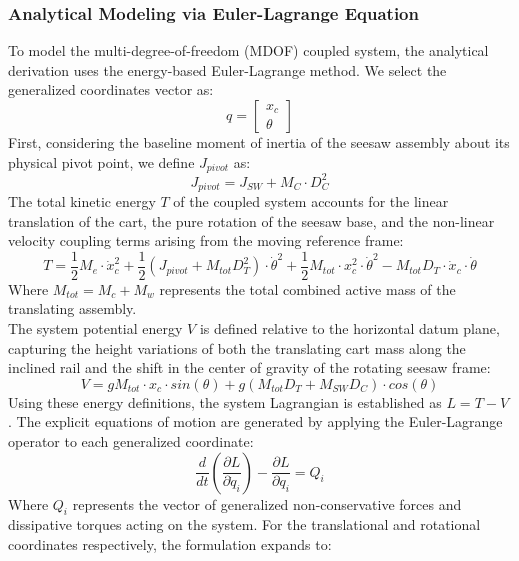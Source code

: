 \documentclass[11pt,a4paper]{article}
\begin{document}
\subsubsection{Analytical Modeling via Euler-Lagrange Equation}\label{subsub:seesaw_euler}
To model the multi-degree-of-freedom (MDOF) coupled system, the analytical derivation uses the energy-based Euler-Lagrange method. We select the generalized coordinates vector as:
\begin{equation}
    q = \begin{bmatrix}
        x_c \\ \theta
    \end{bmatrix}
\end{equation}
First, considering the baseline moment of inertia of the seesaw assembly about its physical pivot point, we define $J_{pivot}$ as:
\begin{equation*}
    J_{pivot} = J_{SW} + M_C \cdot D_C^2
\end{equation*}
The total kinetic energy $T$ of the coupled system accounts for the linear translation of the cart, the pure rotation of the seesaw base, and the non-linear velocity coupling terms arising from the moving reference frame:
\begin{equation}
	T = \frac{1}{2}M_e \cdot \dot{x}_c^2 + \frac{1}{2}(J_{pivot} + M_{tot}D_T^2)\cdot \dot{\theta}^2 + \frac{1}{2} M_{tot} \cdot x_c^2 \cdot \dot{\theta}^2 - M_{tot} D_T \cdot \dot{x}_c \cdot \dot{\theta}
\end{equation}
Where $M_{tot} = M_c + M_w$ represents the total combined active mass of the translating assembly.\\
The system potential energy $V$ is defined relative to the horizontal datum plane, capturing the height variations of both the translating cart mass along the inclined rail and the shift in the center of gravity of the rotating seesaw frame:
\begin{equation}
	V = g M_{tot} \cdot x_c \cdot sin(\theta) + g( M_{tot} D_T + M_{SW}D_C ) \cdot cos(\theta)
\end{equation}
Using these energy definitions, the system Lagrangian is established as $L = T - V$. The explicit equations of motion are generated by applying the Euler-Lagrange operator to each generalized coordinate:
\begin{equation}
    \frac{d}{dt}\left( \frac{\partial L}{\partial \dot{q}_i} \right) - \frac{\partial L}{\partial q_i} = Q_i
\end{equation}
Where $Q_i$ represents the vector of generalized non-conservative forces and dissipative torques acting on the system. For the translational and rotational coordinates respectively, the formulation expands to:
\end{document}
